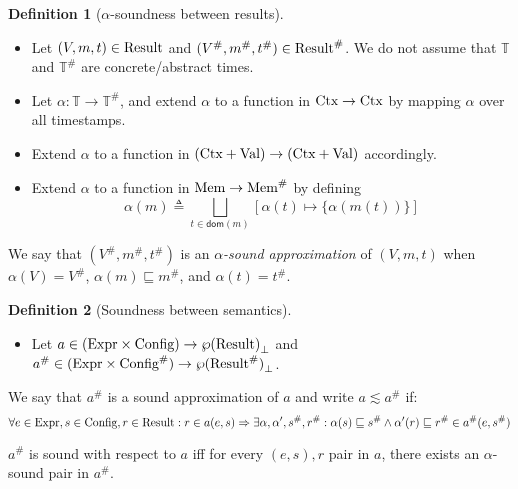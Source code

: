 \documentclass[acmsmall,screen]{acmart}
\theoremstyle{definition}
\newtheorem{definition}{Definition}[section]
\newcommand*{\A}[1]{{#1}^{\#}}
\newcommand*{\Expr}{\text{Expr}}
\newcommand*{\Time}{\mathbb{T}}
\newcommand*{\ATime}{\A{\Time}}
\newcommand*{\Ctx}[1]{\text{Ctx}\vphantom{#1}}
\newcommand*{\Value}[1]{\text{Val}\vphantom{#1}}
\newcommand*{\Mem}[1]{\text{Mem}\vphantom{#1}}
\newcommand*{\mem}{m}
\newcommand*{\AMem}[1]{\A{\text{Mem}}\vphantom{#1}}
\newcommand*{\Config}[1]{\text{Config}\vphantom{#1}}
\newcommand*{\AConfig}[1]{\A{\text{Config}}\vphantom{#1}}
\newcommand*{\Result}[1]{\text{Result}\vphantom{#1}}
\newcommand*{\AResult}[1]{\A{\text{Result}}\vphantom{#1}}
\begin{document}
\begin{definition}[$\alpha$-soundness between results]
  $\:$

  \begin{itemize}
    \item Let $(V,\mem,t)\in\Result{\Time}$ and $(\A{V},\A\mem,\A{t})\in\AResult{\ATime}$. We do not assume that $\Time$ and $\ATime$ are concrete/abstract times.
    \item Let $\alpha:\Time\rightarrow\ATime$, and extend $\alpha$ to a function in $\Ctx{\Time}\rightarrow\Ctx{\ATime}$ by mapping $\alpha$ over all timestamps.
    \item Extend $\alpha$ to a function in $(\Ctx{\Time}+\Value{\Time})\rightarrow(\Ctx{\ATime}+\Value{\ATime})$ accordingly.
    \item Extend $\alpha$ to a function in $\Mem{\Time}\rightarrow\AMem{\ATime}$ by defining
          \[\alpha(\mem)\triangleq\bigsqcup_{t\in\mathsf{dom}(\mem)}[\alpha(t)\mapsto\{\alpha(\mem(t))\}]\]
  \end{itemize}

  We say that $(\A{V},\A\mem,\A{t})$ is an \emph{$\alpha$-sound approximation} of $(V,\mem,t)$ when $\alpha(V)=\A{V}$, $\alpha(\mem)\sqsubseteq\A\mem$, and $\alpha(t)=\A{t}$.
\end{definition}

\begin{definition}[Soundness between semantics]
  $\:$

  \begin{itemize}
    \item Let $a\in(\Expr\times\Config{\Time})\rightarrow{\wp(\Result{\Time})}_{\bot}$ and $\A{a}\in(\Expr\times\AConfig{\ATime})\rightarrow{\wp(\AResult{\ATime})}_{\bot}$.
  \end{itemize}

  We say that $\A{a}$ is a sound approximation of $a$ and write $a\lesssim\A{a}$ if:
  \[
    \forall e\in\Expr,s\in\Config{\Time},r\in\Result{\Time}:r\in a(e,s)\Rightarrow\exists\alpha,\alpha',\A{s},\A{r}:\alpha(s)\sqsubseteq\A{s}\wedge\alpha'(r)\sqsubseteq\A{r}\in\A{a}(e,\A{s})
  \]

  $\A{a}$ is sound with respect to $a$ iff for every $(e,s), r$ pair in $a$, there exists an $\alpha$-sound pair in $\A{a}$.
\end{definition}
\end{document}
